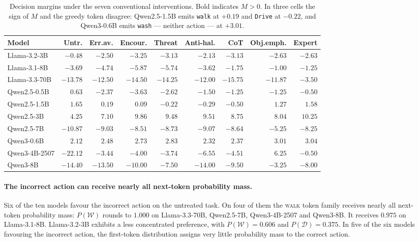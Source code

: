 \begin{table}[t]
\centering
\caption{Decision margins under the seven conventional interventions. Bold indicates
$M>0$. In three cells the sign of $M$ and the greedy token disagree: Qwen2.5-1.5B
emits \texttt{walk} at $+0.19$ and \texttt{Drive} at $-0.22$, and Qwen3-0.6B emits
\texttt{wash} --- neither action --- at $+3.01$.}
\label{tab:conventional-margins}
\vspace{4pt}
\footnotesize
\begin{tabular*}{\columnwidth}{@{\extracolsep{\fill}}lrrrrrrrr@{}}
\toprule
Model & Untr. & Err.av. & Encour. & Threat & Anti-hal. & CoT & Obj.emph. & Expert \\
\midrule
Llama-3.2-3B  & $-0.48$  & $-2.50$  & $-3.25$  & $-3.13$  & $-2.13$  & $-3.13$  & $-2.63$ & $-2.63$ \\
Llama-3.1-8B  & $-3.69$  & $-4.74$  & $-5.87$  & $-5.74$  & $-3.62$  & $-1.75$  & $-1.00$ & $-1.25$ \\
Llama-3.3-70B & $-13.78$ & $-12.50$ & $-14.50$ & $-14.25$ & $-12.00$ & $-15.75$ & $-11.87$ & $-3.50$ \\
Qwen2.5-0.5B  & $\mathbf{0.63}$ & $-2.37$ & $-3.63$ & $-2.62$ & $-1.50$ & $-1.25$ & $-1.25$ & $-0.50$ \\
Qwen2.5-1.5B  & $\mathbf{1.65}$ & $\mathbf{0.19}$ & $\mathbf{0.09}$ & $-0.22$ & $-0.29$ & $-0.50$ & $\mathbf{1.27}$ & $\mathbf{1.58}$ \\
Qwen2.5-3B    & $\mathbf{4.25}$ & $\mathbf{7.10}$ & $\mathbf{9.86}$ & $\mathbf{9.48}$ & $\mathbf{9.51}$ & $\mathbf{8.75}$ & $\mathbf{8.04}$ & $\mathbf{10.25}$ \\
Qwen2.5-7B    & $-10.87$ & $-9.03$ & $-8.51$ & $-8.73$ & $-9.07$ & $-8.64$ & $-5.25$ & $-8.25$ \\
Qwen3-0.6B    & $\mathbf{2.12}$ & $\mathbf{2.48}$ & $\mathbf{2.73}$ & $\mathbf{2.83}$ & $\mathbf{2.32}$ & $\mathbf{2.37}$ & $\mathbf{3.01}$ & $\mathbf{3.04}$ \\
Qwen3-4B-2507 & $-22.12$ & $-3.44$ & $-4.00$ & $-3.74$ & $-6.55$ & $-4.51$ & $\mathbf{6.25}$ & $-0.50$ \\
Qwen3-8B      & $-14.40$ & $-13.50$ & $-10.00$ & $-7.50$ & $-14.00$ & $-9.50$ & $-3.25$ & $-8.00$ \\
\bottomrule
\end{tabular*}
\end{table}

\paragraph{The incorrect action can receive nearly all next-token probability mass.}
Six of the ten models favour the incorrect action on the untreated task. On four of
them the \textsc{walk} token family receives nearly all next-token probability mass:
$P(\mathcal{W})$ rounds to $1.000$ on Llama-3.3-70B, Qwen2.5-7B, Qwen3-4B-2507 and
Qwen3-8B. It receives $0.975$ on Llama-3.1-8B. Llama-3.2-3B exhibits a less
concentrated preference, with $P(\mathcal{W})=0.606$ and $P(\mathcal{D})=0.375$. In
five of the six models favouring the incorrect action, the first-token distribution
assigns very little probability mass to the correct action.

